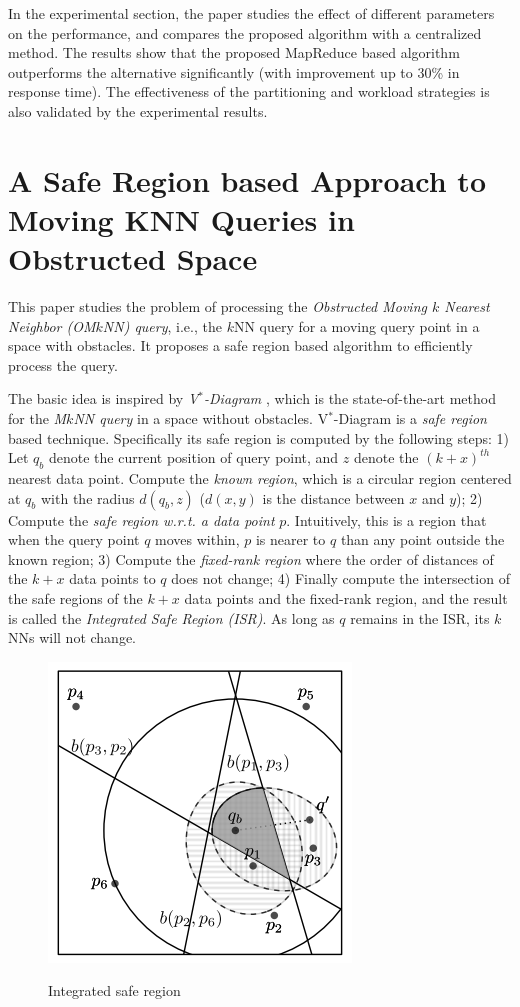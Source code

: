 \documentclass[paper=a4, fontsize=18pt]{article} %
\numberwithin{equation}{section} %
\numberwithin{figure}{section} %
\numberwithin{table}{section} %
\begin{document}
In the experimental section, the paper studies the effect of different parameters on the performance, and compares the proposed algorithm with a centralized method. The results show that the proposed MapReduce based algorithm outperforms the alternative significantly (with improvement up to 30\% in response time). The effectiveness of the partitioning and workload strategies is also validated by the experimental results.


\section{A Safe Region based Approach to Moving KNN Queries in Obstructed Space \cite{Li0QZY15}} \label{sec:obs}

This paper studies the problem of processing the \emph{Obstructed Moving $k$ Nearest Neighbor (OM$k$NN) query}, i.e., the $k$NN query for a moving query point in a space with obstacles. It proposes a safe region based algorithm to efficiently process the query.

The basic idea is inspired by \emph{V$^*$-Diagram} \cite{NZTK08}, which is the state-of-the-art method for the \emph{M$k$NN query} in a space without obstacles. V$^*$-Diagram is a \emph{safe region} based technique. Specifically its safe region is computed by the following steps: 1) Let $q_b$ denote the current position of query point, and $z$ denote the $(k+x)^{th}$ nearest data point. Compute the \emph{known region}, which is a circular region centered at $q_b$ with the radius $d(q_b, z)$ ($d(x,y)$ is the distance between $x$ and $y$); 2) Compute the \emph{safe region w.r.t. a data point} $p$. Intuitively, this is a region that when the query point $q$ moves within, $p$ is nearer to $q$ than any point outside the known region; 3) Compute the \emph{fixed-rank region} where the order of distances of the $k+x$ data points to $q$ does not change; 4) Finally compute the intersection of the safe regions of the $k+x$ data points and the fixed-rank region, and the result is called the \emph{Integrated Safe Region (ISR)}. As long as $q$ remains in the ISR, its $k$NNs will not change.

\begin{figure}[h]
  \centering
  \includegraphics[width=.5\linewidth]{8_8_oisr1.png}\\
  \caption{Integrated safe region}\label{fig:oisr1}
\end{figure}
\end{document}
